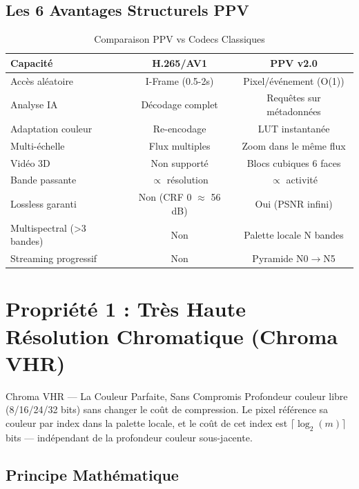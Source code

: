 \documentclass[12pt,a4paper]{article}
\begin{document}
	\subsection{Les 6 Avantages Structurels PPV}
	
	\begin{table}[h]
		\centering
		\caption{Comparaison PPV vs Codecs Classiques}
		\label{tab:comparaison}
		\begin{tabular}{@{}lcc@{}}
			\toprule
			\textbf{Capacité} & \textbf{H.265/AV1} & \textbf{PPV v2.0} \\ \midrule
			Accès aléatoire & I-Frame (0.5-2s) & Pixel/événement (O(1)) \\
			Analyse IA & Décodage complet & Requêtes sur métadonnées \\
			Adaptation couleur & Re-encodage & LUT instantanée \\
			Multi-échelle & Flux multiples & Zoom dans le même flux \\
			Vidéo 3D & Non supporté & Blocs cubiques 6 faces \\
			Bande passante & $\propto$ résolution & $\propto$ activité \\
			Lossless garanti & Non (CRF 0 $\approx$ 56 dB) & Oui (PSNR infini) \\
			Multispectral (>3 bandes) & Non & Palette locale N bandes \\
			Streaming progressif & Non & Pyramide N0$\to$N5 \\
			\bottomrule
		\end{tabular}
	\end{table}
	
	\section{Propriété 1 : Très Haute Résolution Chromatique (Chroma VHR)}
	
	\begin{featurebox}{Chroma VHR — La Couleur Parfaite, Sans Compromis}
		Profondeur couleur libre (8/16/24/32 bits) sans changer le coût de compression. Le pixel référence sa couleur par index dans la palette locale, et le coût de cet index est $\lceil \log_2(m) \rceil$ bits — indépendant de la profondeur couleur sous-jacente.
	\end{featurebox}
	
	\subsection{Principe Mathématique}
	
\end{document}
